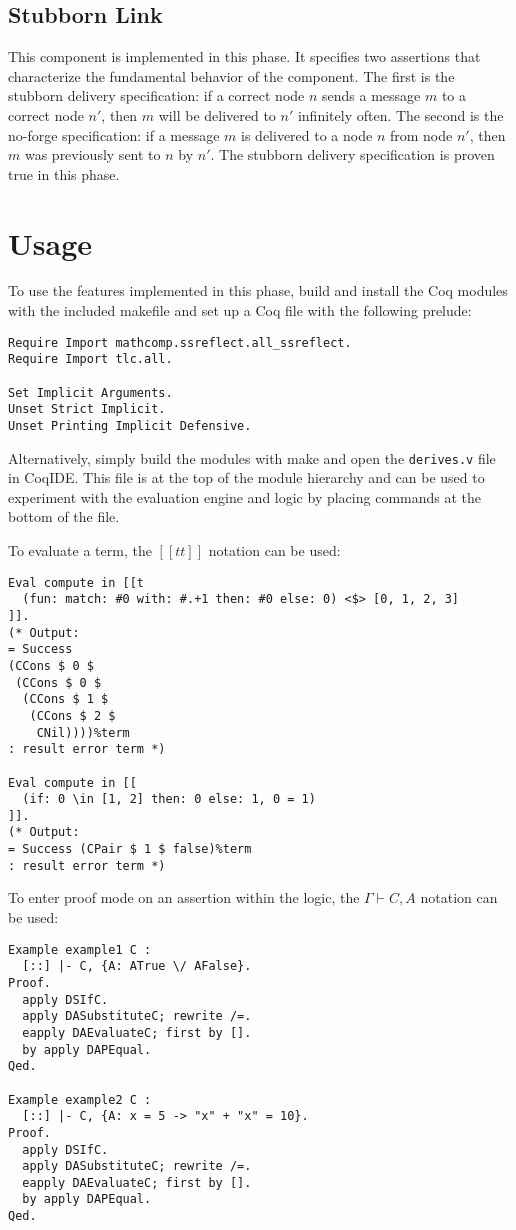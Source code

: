 \documentclass[12pt]{article}
\begin{document}
\subsection{Stubborn Link}

This component is implemented in this phase.  It specifies two
assertions that characterize the fundamental behavior of the component.
The first is the stubborn delivery specification: if a correct node $n$
sends a message $m$ to a correct node $n'$, then $m$ will be delivered
to $n'$ infinitely often.  The second is the no-forge specification: if
a message $m$ is delivered to a node $n$ from node $n'$, then $m$ was
previously sent to $n$ by $n'$.  The stubborn delivery specification is
proven true in this phase.

\section{Usage}

To use the features implemented in this phase, build and install the
Coq modules with the included makefile and set up a Coq file with the
following prelude:

\begin{verbatim}
Require Import mathcomp.ssreflect.all_ssreflect.
Require Import tlc.all.

Set Implicit Arguments.
Unset Strict Implicit.
Unset Printing Implicit Defensive.
\end{verbatim}

Alternatively, simply build the modules with make and open the
\texttt{derives.v} file in CoqIDE.  This file is at the top of the
module hierarchy and can be used to experiment with the evaluation
engine and logic by placing commands at the bottom of the file.

To evaluate a term, the $[[t t ]]$ notation can be used:

\begin{verbatim}
Eval compute in [[t
  (fun: match: #0 with: #.+1 then: #0 else: 0) <$> [0, 1, 2, 3]
]].
(* Output:
= Success
(CCons $ 0 $
 (CCons $ 0 $
  (CCons $ 1 $
   (CCons $ 2 $
    CNil))))%term
: result error term *)

Eval compute in [[
  (if: 0 \in [1, 2] then: 0 else: 1, 0 = 1)
]].
(* Output:
= Success (CPair $ 1 $ false)%term
: result error term *)
\end{verbatim}

To enter proof mode on an assertion within the logic, the
$\Gamma \vdash C, A$ notation can be used:

\begin{verbatim}
Example example1 C :
  [::] |- C, {A: ATrue \/ AFalse}.
Proof.
  apply DSIfC.
  apply DASubstituteC; rewrite /=.
  eapply DAEvaluateC; first by [].
  by apply DAPEqual.
Qed.

Example example2 C :
  [::] |- C, {A: x = 5 -> "x" + "x" = 10}.
Proof.
  apply DSIfC.
  apply DASubstituteC; rewrite /=.
  eapply DAEvaluateC; first by [].
  by apply DAPEqual.
Qed.
\end{verbatim}
\end{document}

